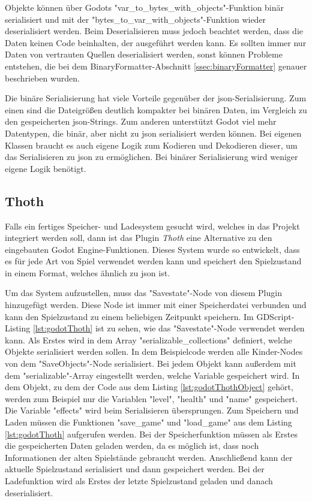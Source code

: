 Objekte können über Godots "var\_to\_bytes\_with\_objects"-Funktion binär serialisiert und mit der "bytes\_to\_var\_with\_objects"-Funktion wieder deserialisiert werden. Beim Deserialisieren muss jedoch beachtet werden, dass die Daten keinen Code beinhalten, der ausgeführt werden kann. Es sollten immer nur Daten von vertrauten Quellen deserialisiert werden, sonst können Probleme entstehen, die bei dem BinaryFormatter-Abschnitt \ref{ssec:binaryFormatter} genauer beschrieben wurden.\cite{godotengineGlobalScope}

Die binäre Serialisierung hat viele Vorteile gegenüber der \ac{json}-Serialisierung. Zum einen sind die Dateigrößen deutlich kompakter bei binären Daten, im Vergleich zu den gespeicherten \ac{json}-Strings. Zum anderen unterstützt Godot viel mehr Datentypen, die binär, aber nicht zu \ac{json} serialisiert werden können. Bei eigenen Klassen braucht es auch eigene Logik zum Kodieren und Dekodieren dieser, um das Serialisieren zu \ac{json} zu ermöglichen. Bei binärer Serialisierung wird weniger eigene Logik benötigt.\cite{godotengineSavingGames}



\subsection{Thoth}
Falls ein fertiges Speicher- und Ladesystem gesucht wird, welches in das Projekt integriert werden soll, dann ist das Plugin \textit{Thoth} eine Alternative zu den eingebauten Godot Engine-Funktionen. Dieses System wurde so entwickelt, dass es für jede Art von Spiel verwendet werden kann und speichert den Spielzustand in einem Format, welches ähnlich zu \ac{json} ist.\cite{stupidratstudioGodotSaveLoad}

Um das System aufzustellen, muss das "Savestate"-Node von diesem Plugin hinzugefügt werden. Diese Node ist immer mit einer Speicherdatei verbunden und kann den Spielzustand zu einem beliebigen Zeitpunkt speichern. Im GDScript-Listing \ref{lst:godotThoth} ist zu sehen, wie das "Savestate"-Node verwendet werden kann. Als Erstes wird in dem Array "serializable\_collections" definiert, welche Objekte serialisiert werden sollen. In dem Beispielcode werden alle Kinder-Nodes von dem "SaveObjects"-Node serialisiert. Bei jedem Objekt kann außerdem mit dem "serializable"-Array eingestellt werden, welche Variable gespeichert wird. In dem Objekt, zu dem der Code aus dem Listing \ref{lst:godotThothObject} gehört, werden zum Beispiel nur die Variablen "level", "health" und "name" gespeichert. Die Variable "effects" wird beim Serialisieren übersprungen. Zum Speichern und Laden müssen die Funktionen "save\_game" und "load\_game" aus dem Listing \ref{lst:godotThoth} aufgerufen werden. Bei der Speicherfunktion müssen als Erstes die gespeicherten Daten geladen werden, da es möglich ist, dass noch Informationen der alten Spielstände gebraucht werden. Anschließend kann der aktuelle Spielzustand serialisiert und dann gespeichert werden. Bei der Ladefunktion wird als Erstes der letzte Spielzustand geladen und danach deserialisiert.\cite{stupidratstudioGodotSaveLoad} 

